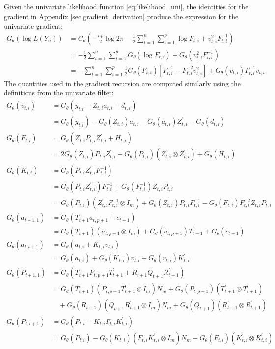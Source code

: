 \documentclass[12pt]{article}
\newcommand{\Gt}{G_\theta}
\begin{document}
	Given the univariate likelihood function \eqref{eq:likelihood_uni}, the identities for the gradient in Appendix \ref{sec:gradient_derivation} produce the expression for the univariate gradient: 
	\begin{align*}
	\Gt(\log L(Y_n)) &= \Gt \left(-\frac{np}{2} \log 2\pi - \frac{1}{2} \sum_{t=1}^n \sum_{i=1}^p \log F_{t,i}+ v_{t,i}^2 F_{t,i}^{-1}\right) \\
	&= -\frac{1}{2} \sum_{t=1}^n \sum_{i=1}^p \Gt(\log F_{t,i}) + \Gt(v_{t,i}^2 F_{t,i}^{-1}) \\
	&= - \sum_{t=1}^n \sum_{i=1}^p \frac{1}{2}  \Gt(F_{t,i}) \left[F_{t,i}^{-1} - F_{t,i}^{-2} v_{t,i}^2\right] +  \Gt(v_{t,i}) F_{t,i}^{-1} v_{t,i}
	\end{align*}
	The quantities used in the gradient recursion are computed similarly using the definitions from the univariate filter: 
	\begin{align*}
	\Gt(v_{t,i}) &= \Gt(y_{t,i} - Z_{t,i} a_{t,i} - d_{t,i}) \\
	&= \Gt(y_{t,i}) -\Gt(Z_{t,i}) a_{t,i} - \Gt(a_{t,i}) Z_{t,i}^\prime - \Gt(d_{t,i}) \\
	\Gt(F_{t,i}) &= \Gt(Z_{t,i} P_{t,i} Z_{t,i}^\prime + H_{t,i}) \\
	&= 2 \Gt(Z_{t,i})P_{t,i} Z_{t,i}^\prime + \Gt(P_{t,i}) (Z_{t,i}^\prime \otimes Z_{t,i}^\prime) + \Gt(H_{t,i}) \\
	\Gt(K_{t,i}) &= \Gt(P_{t,i} Z_{t,i}^\prime F_{t,i}^{-1}) \\
	&= \Gt(P_{t,i} Z_{t,i}^\prime) F_{t,i}^{-1} + \Gt(F_{t,i}^{-1}) Z_{t,i} P_{t,i} \\
	&= \Gt(P_{t,i}) (Z_{t,i}^\prime F_{t,i}^{-1} \otimes I_m) + \Gt(Z_{t,i}) P_{t,i} F_{t,i}^{-1} - \Gt(F_{t,i}) F_{t,i}^{-2} Z_{t,i} P_{t,i} \\
	\Gt(a_{t+1,1}) &= \Gt(T_{t+1} a_{t,p+1} + c_{t+1}) \\
	&= \Gt(T_{t+1}) (a_{t,p+1} \otimes I_m) + \Gt(a_{t,p+1}) T_{t+1}^\prime + \Gt(c_{t+1})\\ 
	\Gt(a_{t,i+1}) &= \Gt(a_{t,i} + K_{t,i} v_{t,i}) \\	
	&= \Gt(a_{t,i}) + \Gt(K_{t,i})v_{t,i} + \Gt(v_{t,i})K_{t,i}^\prime \\
	\Gt(P_{t+1,1}) &= \Gt(T_{t+1} P_{t,p+1} T_{t+1}^\prime + R_{t+1} Q_{t+1} R_{t+1}^\prime) \\
	&= \Gt(T_{t+1})(P_{t,p+1} T_{t+1}^\prime \otimes I_m) N_m + \Gt(P_{t,p+1})(T_{t+1}^\prime \otimes T_{t+1}^\prime) \\
	&\quad + \Gt(R_{t+1})(Q_{t+1} R_{t+1}^\prime \otimes I_m) N_m + \Gt(Q_{t+1})(R_{t+1}^\prime \otimes R_{t+1}^\prime) \\
	\Gt(P_{t,i+1}) &= \Gt(P_{t,i} - K_{t,i} F_{t,i} K_{t,i}^\prime) \\ 
	&= \Gt(P_{t,i}) - \Gt(K_{t,i})(F_{t,i}K_{t,i}^\prime \otimes I_m) N_m - \Gt(F_{t,i})(K_{t,i}^\prime \otimes K_{t,i}^\prime)
	\end{align*}
\end{document}
